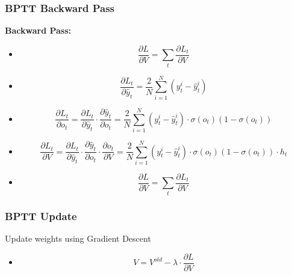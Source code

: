   \begin{frame}
   \frametitle{BPTT Backward Pass}
   
    \textbf{Backward Pass:}
   
   \begin{itemize}
    \item<2->{
    \begin{equation}
     \frac{\partial L}{\partial V} = \sum_t\frac{\partial L_t}{\partial V}
    \end{equation}
    }
    \item<3->{
    \begin{equation}
     \frac{\partial L_t}{\partial \hat{y}_t} = \frac{2}{N}\sum_{i=1}^{N}(y_t^i-\hat{y}_t^i)
    \end{equation}
    }
    \item<4->{
    \begin{equation}
     \frac{\partial L_t}{\partial o_t} = \frac{\partial L_t}{\partial \hat{y}_t} \cdot \frac{\partial \hat{y}_t}{\partial o_t} = \frac{2}{N}\sum_{i=1}^{N}(y_t^i-
     \hat{y}_t^i) \cdot \sigma(o_t)(1- \sigma(o_t))
    \end{equation}
    }
    \item<5->{
    \begin{equation}
     \frac{\partial L_t}{\partial V} = \frac{\partial L_t}{\partial \hat{y}_t} \cdot \frac{\partial \hat{y}_t}{\partial o_t} \cdot \frac{\partial o_t}{\partial V} 
     = \frac{2}{N}\sum_{i=1}^{N}(y_t^i-\hat{y}_t^i) \cdot \sigma(o_t)(1-\sigma(o_t)) \cdot h_t
    \end{equation}
    }
    \item<6->{
    \begin{equation}
     \frac{\partial L}{\partial V} = \sum_t\frac{\partial L_t}{\partial V}
    \end{equation}
    }
   \end{itemize}     
  
  \end{frame}
  \begin{frame}
   \frametitle{BPTT Update}
   
    Update weights using Gradient Descent   
   
   \begin{itemize}
    \item<2->{
    \begin{equation}
     V = V^{old} - \lambda \cdot \frac{\partial L}{\partial V}
    \end{equation}
    }
   \end{itemize}
  
  \end{frame}
